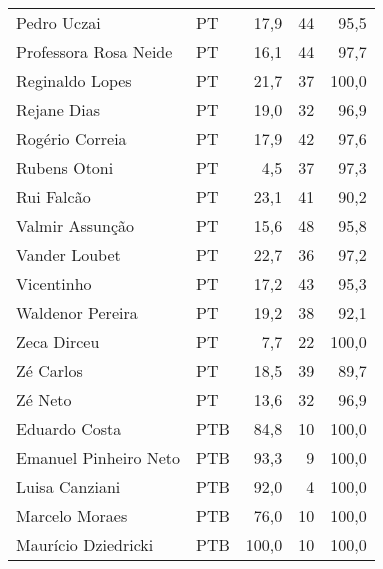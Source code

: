 \begin{longtable}{llrrr}
                         Pedro Uczai &             PT &      17,9 &           44 &       95,5 \\
               Professora Rosa Neide &             PT &      16,1 &           44 &       97,7 \\
                     Reginaldo Lopes &             PT &      21,7 &           37 &      100,0 \\
                         Rejane Dias &             PT &      19,0 &           32 &       96,9 \\
                     Rogério Correia &             PT &      17,9 &           42 &       97,6 \\
                        Rubens Otoni &             PT &       4,5 &           37 &       97,3 \\
                          Rui Falcão &             PT &      23,1 &           41 &       90,2 \\
                     Valmir Assunção &             PT &      15,6 &           48 &       95,8 \\
                       Vander Loubet &             PT &      22,7 &           36 &       97,2 \\
                          Vicentinho &             PT &      17,2 &           43 &       95,3 \\
                    Waldenor Pereira &             PT &      19,2 &           38 &       92,1 \\
                         Zeca Dirceu &             PT &       7,7 &           22 &      100,0 \\
                           Zé Carlos &             PT &      18,5 &           39 &       89,7 \\
                             Zé Neto &             PT &      13,6 &           32 &       96,9 \\
                       Eduardo Costa &            PTB &      84,8 &           10 &      100,0 \\
               Emanuel Pinheiro Neto &            PTB &      93,3 &            9 &      100,0 \\
                      Luisa Canziani &            PTB &      92,0 &            4 &      100,0 \\
                      Marcelo Moraes &            PTB &      76,0 &           10 &      100,0 \\
                 Maurício Dziedricki &            PTB &     100,0 &           10 &      100,0 \\

\end{longtable}
